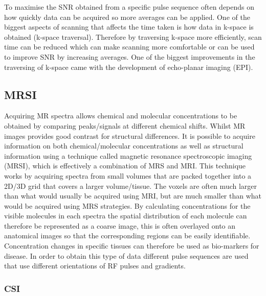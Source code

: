 \documentclass[class=article, crop=false]{standalone}
\begin{document}
To maximise the SNR obtained from a specific pulse sequence often depends on how quickly data can be acquired so more averages can be applied. One of the biggest aspects of scanning that affects the time taken is how data in k-space is obtained (k-space traversal). Therefore by traversing k-space more efficiently, scan time can be reduced which can make scanning more comfortable or can be used to improve SNR by increasing averages. One of the biggest improvements in the traversing of k-space came with the development of echo-planar imaging (EPI)\cite{Stehling1991Echo-planarSecond}.

\subsection{MRSI}

Acquiring MR spectra allows chemical and molecular concentrations to be obtained by comparing peaks/signals at different chemical shifts. Whilst MR images provides good contrast for structural differences. It is possible to acquire information on both chemical/molecular concentrations as well as structural information using a technique called magnetic resonance spectroscopic imaging (MRSI), which is effectively a combination of MRS and MRI. This technique works by acquiring spectra from small volumes that are packed together into a 2D/3D grid that covers a larger volume/tissue. The voxels are often much larger than what would usually be acquired using MRI, but are much smaller than what would be acquired using MRS strategies. By calculating concentrations for the visible molecules in each spectra the spatial distribution of each molecule can therefore be represented as a coarse image, this is often overlayed onto an anatomical images so that the corresponding regions can be easily identifiable. Concentration changes in specific tissues can therefore be used as bio-markers for disease. In order to obtain this type of data different pulse sequences are used that use different orientations of RF pulses and gradients. 

\subsubsection{CSI}
\end{document}

